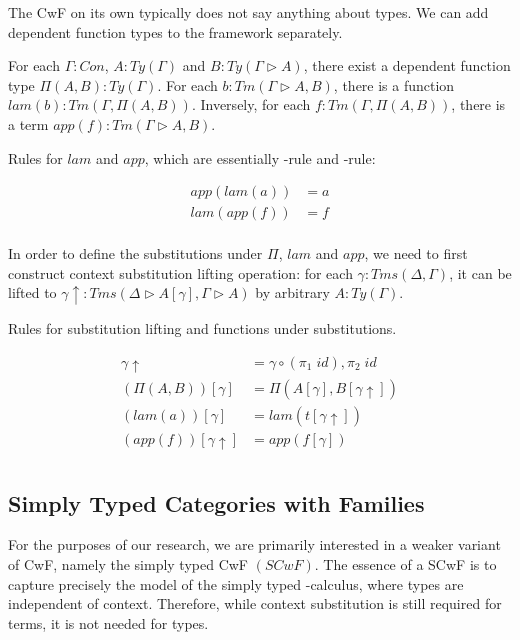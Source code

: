 The CwF on its own typically does not say anything about types. We can add dependent function types to the framework separately.

For each $\Gamma : Con$, $A : Ty(\Gamma)$ and $B : Ty(\Gamma \triangleright A)$, there exist a dependent function type $\Pi (A, B) : Ty(\Gamma)$. For each $b : Tm(\Gamma \triangleright A, B)$, there is a function $lam(b) : Tm (\Gamma, \Pi (A, B))$. Inversely, for each $f : Tm(\Gamma, \Pi (A, B))$, there is a term $app(f) : Tm(\Gamma \triangleright A, B)$.

Rules for $lam$ and $app$, which are essentially \beta-rule and \eta-rule:

\begin{align*}
  app (lam (a)) & = a \\
  lam (app (f)) & = f \\
\end{align*}

In order to define the substitutions under $\Pi$, $lam$ and $app$, we need to first construct context substitution lifting operation: for each $\gamma : Tms (\Delta, \Gamma)$, it can be lifted to $\gamma \uparrow : Tms (\Delta \triangleright A [\gamma], \Gamma \triangleright A)$ by arbitrary $A : Ty(\Gamma)$.

Rules for substitution lifting and functions under substitutions.

\begin{align*}
  \gamma \uparrow & = \gamma \circ (\pi_1\;id) , \pi_2\;id \\
  (\Pi(A,B)) [\gamma] &= \Pi (A [\gamma], B [\gamma \uparrow]) \\
  (lam (a)) [\gamma] &= lam (t [\gamma \uparrow]) \\
  (app (f)) [\gamma \uparrow] &= app (f [\gamma]) \\
\end{align*}

\subsection{Simply Typed Categories with Families}

For the purposes of our research, we are primarily interested in a weaker variant of CwF, namely the simply typed CwF $(SCwF)$. The essence of a SCwF is to capture precisely the model of the simply typed \lambda-calculus, where types are independent of context. Therefore, while context substitution is still required for terms, it is not needed for types.

